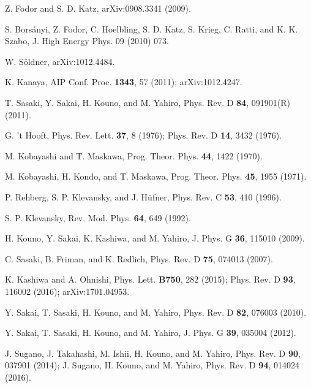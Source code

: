 \documentclass[prd,superscriptaddress,unsortedaddress,
twocolumn,showpacs,preprintnumbers,amsmath,amssymb]{revtex4}
\begin{document}
\begin{thebibliography}{99}
         Z. Fodor and S. D. Katz, arXiv:0908.3341 (2009).

         S. Bors\'{a}nyi, Z. Fodor, C. Hoelbling,
         S. D. Katz, S. Krieg, C. Ratti, and K. K. Szabo,
         J. High Energy Phys. 09 (2010) 073.

         W. S\"{o}ldner, arXiv:1012.4484.

         K. Kanaya, AIP Conf. Proc. \textbf{1343}, 57 (2011);
         arXiv:1012.4247.

         T. Sasaki, Y. Sakai, H. Kouno, and M. Yahiro,
         Phys. Rev. D \textbf{84}, 091901(R) (2011).
         
         G. 't Hooft, Phys. Rev. Lett. \textbf{37}, 8 (1976);
         Phys. Rev. D \textbf{14}, 3432 (1976).

         M. Kobayashi and T. Maskawa,
         Prog. Theor. Phys. \textbf{44}, 1422 (1970).

         M. Kobayashi, H. Kondo, and T. Maskawa,
         Prog. Theor. Phys. \textbf{45}, 1955 (1971).

         P. Rehberg, S. P. Klevansky, and J. H\"{u}fner,
         Phys. Rev. C \textbf{53}, 410 (1996).

         S. P. Klevansky, Rev. Mod. Phys. \textbf{64}, 649 (1992).

         H. Kouno, Y. Sakai, K. Kashiwa, and M. Yahiro,
         J. Phys. G \textbf{36}, 115010 (2009).

         C. Sasaki, B. Friman, and K. Redlich,
         Phys. Rev. D \textbf{75}, 074013 (2007).

         K. Kashiwa and A. Ohnishi,
         Phys. Lett. \textbf{B750}, 282 (2015);
         Phys. Rev. D \textbf{93}, 116002 (2016);
         arXiv:1701.04953.

         Y. Sakai, T. Sasaki, H. Kouno, and M. Yahiro,
         Phys. Rev. D \textbf{82}, 076003 (2010).

         Y. Sakai, T. Sasaki, H. Kouno, and M. Yahiro,
         J. Phys. G \textbf{39}, 035004 (2012).

         J. Sugano, J. Takahashi, M. Ishii, H. Kouno,
         and M. Yahiro,
         Phys. Rev. D \textbf{90}, 037901 (2014);
         J. Sugano, H. Kouno, and M. Yahiro,
         Phys. Rev. D \textbf{94}, 014024 (2016).


\end{thebibliography}
\end{document}
